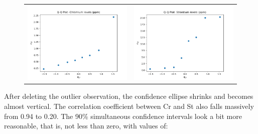 \begin{enumerate}[label=(\alph*)]
    \begin{figure}[H]
        \centering
        \begin{tabular}{cc}
            \includegraphics[scale=0.35]{./python/chapter-5/Question-5-11-d-QQ-Cr.png} &
            \includegraphics[scale=0.35]{./python/chapter-5/Question-5-11-d-QQ-St.png}
        \end{tabular}
    \end{figure}

    After deleting the outlier observation, the confidence ellipse shrinks and becomes almost vertical. The correlation coefficient between Cr and St also falls massively from 0.94 to 0.20. The 90\% simultaneous confidence intervals look a bit more reasonable, that is, not less than zero, with values of:


\end{enumerate}
